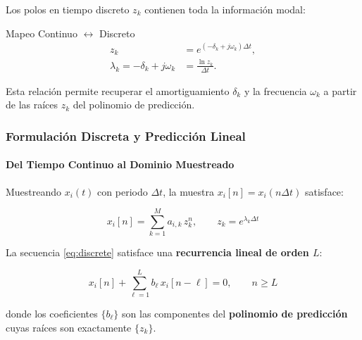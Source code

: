 \documentclass{beamer}
\begin{document}
\begin{frame}

Los polos en tiempo discreto $z_k$ contienen toda la información modal:

\begin{block}{Mapeo Continuo $\leftrightarrow$ Discreto}
\begin{align}
    z_k &= e^{(-\delta_k + j\omega_k)\Delta t}, \\[4pt]
    \lambda_k = -\delta_k + j\omega_k &= \frac{\ln z_k}{\Delta t}.
    \label{eq:mapping}
\end{align}
\end{block}

\vspace{0.3em}
Esta relación permite recuperar el amortiguamiento $\delta_k$ y la frecuencia
$\omega_k$ a partir de las raíces $z_k$ del polinomio de predicción.

\end{frame}

\begin{frame}
\frametitle{Formulación Discreta y Predicción Lineal}
\framesubtitle{Del Tiempo Continuo al Dominio Muestreado}

Muestreando $x_i(t)$ con periodo $\Delta t$, la muestra $x_i[n] = x_i(n\Delta t)$ satisface:

\begin{equation}
    x_i[n] = \sum_{k=1}^{M} a_{i,k}\, z_k^n, \qquad z_k = e^{\lambda_k \Delta t}
    \label{eq:discrete}
\end{equation}

\vspace{0.3em}
La secuencia \eqref{eq:discrete} satisface una \textbf{recurrencia lineal de orden $L$}:

\begin{equation}
    x_i[n] + \sum_{\ell=1}^{L} b_\ell\, x_i[n-\ell] = 0, \qquad n \geq L
    \label{eq:ar}
\end{equation}

donde los coeficientes $\{b_\ell\}$ son las componentes del \textbf{polinomio de predicción} cuyas raíces son exactamente $\{z_k\}$.

\end{frame}
\end{document}
